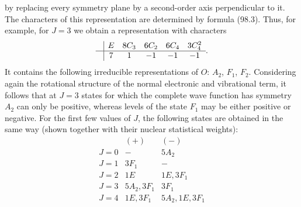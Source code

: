 by replacing every symmetry plane by a second-order axis perpendicular to it. The characters of this representation are determined by formula (98.3). Thus, for example, for $J=3$ we obtain a representation with characters
\[
\begin{array}{c|ccccc}&E&8C_3&6C_2&6C_4&3C_4^2\\\hline&7&1&-1&-1&-1\end{array}.
\]
It contains the following irreducible representations of $O$: $A_2$, $F_1$, $F_2$. Considering again the rotational structure of the normal electronic and vibrational term, it follows that at $J=3$ states for which the complete wave function has symmetry $A_2$ can only be positive, whereas levels of the state $F_1$ may be either positive or negative. For the first few values of $J$, the following states are obtained in the same way (shown together with their nuclear statistical weights):
\[
\begin{array}{c|cc}&(+)&(-)\\\hline
J=0&-&5A_2\\
J=1&3F_1&-\\
J=2&1E&1E,3F_1\\
J=3&5A_2,3F_1&3F_1\\
J=4&1E,3F_1&5A_2,1E,3F_1
\end{array}
\]
